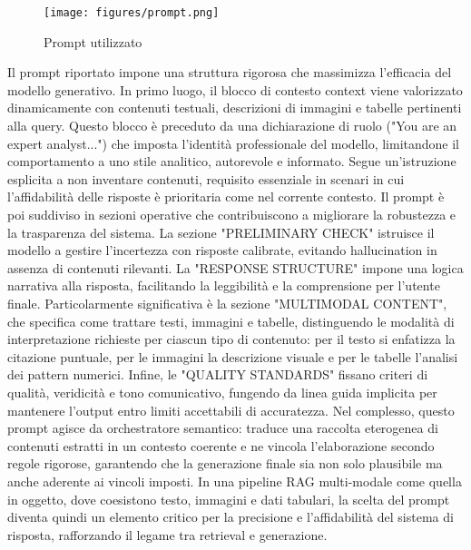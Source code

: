 \begin{figure}[!ht]
\centering
\texttt{[image: figures/prompt.png]}
\caption{Prompt utilizzato}
\end{figure}
Il prompt riportato impone una struttura rigorosa che massimizza l’efficacia del modello generativo. In primo luogo, il blocco di contesto {context} viene valorizzato dinamicamente con contenuti testuali, descrizioni di immagini e tabelle pertinenti alla query. Questo blocco è preceduto da una dichiarazione di ruolo ("You are an expert analyst...") che imposta l’identità professionale del modello, limitandone il comportamento a uno stile analitico, autorevole e informato. Segue un'istruzione esplicita a non inventare contenuti, requisito essenziale in scenari in cui l'affidabilità delle risposte è prioritaria come nel corrente contesto.
Il prompt è poi suddiviso in sezioni operative che contribuiscono a migliorare la robustezza e la trasparenza del sistema. La sezione "PRELIMINARY CHECK" istruisce il modello a gestire l’incertezza con risposte calibrate, evitando hallucination in assenza di contenuti rilevanti. La "RESPONSE STRUCTURE" impone una logica narrativa alla risposta, facilitando la leggibilità e la comprensione per l’utente finale. Particolarmente significativa è la sezione "MULTIMODAL CONTENT", che specifica come trattare testi, immagini e tabelle, distinguendo le modalità di interpretazione richieste per ciascun tipo di contenuto: per il testo si enfatizza la citazione puntuale, per le immagini la descrizione visuale e per le tabelle l'analisi dei pattern numerici. Infine, le "QUALITY STANDARDS" fissano criteri di qualità, veridicità e tono comunicativo, fungendo da linea guida implicita per mantenere l’output entro limiti accettabili di accuratezza.
Nel complesso, questo prompt agisce da orchestratore semantico: traduce una raccolta eterogenea di contenuti estratti in un contesto coerente e ne vincola l’elaborazione secondo regole rigorose, garantendo che la generazione finale sia non solo plausibile ma anche aderente ai vincoli imposti. In una pipeline RAG multi-modale come quella in oggetto, dove coesistono testo, immagini e dati tabulari, la scelta del prompt diventa quindi un elemento critico per la precisione e l’affidabilità del sistema di risposta, rafforzando il legame tra retrieval e generazione.

